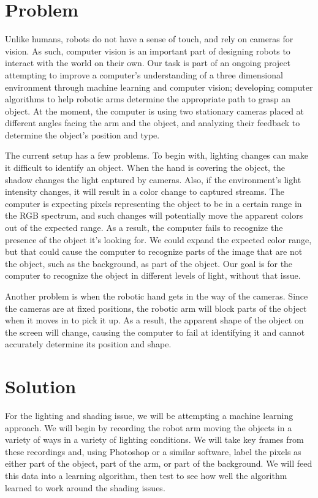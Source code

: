 \documentclass{article}
\begin{document}
\section{Problem}
Unlike humans, robots do not have a sense of touch, and rely on cameras for vision.
As such, computer vision is an important part of designing robots to interact with the world on their own.
Our task is part of an ongoing project attempting to improve a computer’s understanding of a three
dimensional environment through machine learning and computer vision; developing computer algorithms
to help robotic arms determine the appropriate path to grasp an object.
At the moment, the computer is using two stationary cameras placed at different angles facing the arm
and the object, and analyzing their feedback to determine the object’s position and type.

The current setup has a few problems.
To begin with, lighting changes can make it difficult to identify an object.
When the hand is covering the object, the shadow changes the light captured by cameras.
Also, if the environment’s light intensity changes, it will result in a color change to captured streams.
The computer is expecting pixels representing the object to be in a certain range in the RGB spectrum,
and such changes will potentially move the apparent colors out of the expected range.
As a result, the computer fails to recognize the presence of the object it’s looking for.
We could expand the expected color range, but that could cause the computer to recognize parts of the
image that are not the object, such as the background, as part of the object.
Our goal is for the computer to recognize the object in different levels of light, without that issue.

Another problem is when the robotic hand gets in the way of the cameras.
Since the cameras are at fixed positions, the robotic arm will block parts of the object when it moves in to pick it up.
As a result, the apparent shape of the object on the screen will change, causing the computer to fail at identifying it and cannot accurately determine its position and shape.



\section{Solution}
For the lighting and shading issue, we will be attempting a machine learning approach.
We will begin by recording the robot arm moving the objects in a variety of ways in a variety of lighting conditions.
We will take key frames from these recordings and, using Photoshop or a similar software, label the pixels as either part of the object, part of the arm, or part of the background.
We will feed this data into a learning algorithm, then test to see how well the algorithm learned to work around the shading issues.
\end{document}
